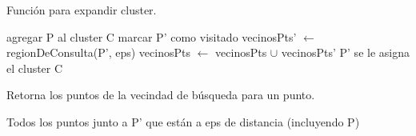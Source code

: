 \begin{algorithm}[ht]
  \caption{Función para expandir cluster.
    \label{alg:expandirCluster}}
  \begin{algorithmic}[1]
  \State agregar P al cluster C
         \State marcar P' como visitado\;
         \State vecinosPts' $\gets$ regionDeConsulta(P', eps)\;
            \State vecinosPts $\gets$ vecinosPts $\cup$ vecinosPts'
        \EndIf
    \EndIf
         \State P' se le asigna el cluster C
    \EndIf
    \EndFor
    \EndFunction
  \end{algorithmic}
\end{algorithm}



\begin{algorithm}[ht]
  \caption{Retorna los puntos de la vecindad de búsqueda para un punto.
    \label{alg:regionDeConsulta}}
  \begin{algorithmic}[1]
    
    \Return Todos los puntos junto a P' que están a eps de distancia (incluyendo P)
    \EndFunction
  \end{algorithmic}
\end{algorithm}


